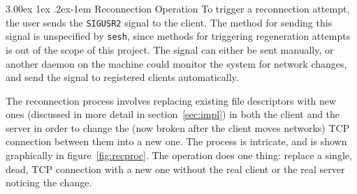 \documentclass[twocolumn,11pt]{article}
\makeatletter
\newcommand{\sesh}{\texttt{sesh}\xspace}
\renewcommand{\paragraph}{%
  \@startsection{paragraph}{4}%
  {\z@}{3.00ex \@plus 1ex \@minus .2ex}{-1em}%
  {\normalfont\normalsize\bfseries}%
}
\makeatother
\begin{document}
\paragraph{Reconnection Operation}
To trigger a reconnection attempt, the user sends the \texttt{SIGUSR2} signal to
the client. The method for sending this signal is unspecified by \sesh, since
methods for triggering regeneration attempts is out of the scope of this
project. The signal can
either be sent manually, or another daemon on the machine could monitor the
system for network changes, and send the signal to registered clients
automatically.

The reconnection process involves replacing existing file descriptors with new
ones (discussed in more detail in section~\ref{sec:impl}) in both the client and
the server in order to change the (now broken after the client moves networks)
TCP connection between them into a new one. The process is intricate, and is
shown graphically in figure~\ref{fig:recproc}. The operation does one thing:
replace a single, dead, TCP connection with a new one without the real client or
the real server noticing the change.
\end{document}
